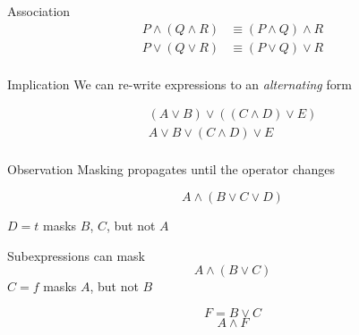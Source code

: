 \documentclass[xcolor = {dvipsnames, table}, aspectratio=169]{beamer}
\begin{document}
\begin{frame}
    \begin{block}{Association}
        \begin{align*}
            P \wedge (Q \wedge R) & \equiv (P \wedge Q) \wedge R \\
            P \vee (Q \vee R) & \equiv (P \vee Q) \vee R \\
        \end{align*}
    \end{block}

    \begin{block}{Implication}
        We can re-write expressions to an \emph{alternating} form

        \begin{align*}
            (A \vee B) \vee ((C \wedge D) \vee E) \\
            A \vee B \vee (C \wedge D) \vee E     \\
        \end{align*}
    \end{block}
\end{frame}

\begin{frame}
    \begin{block}{Observation}
        Masking propagates until the operator changes
    \end{block}

    \begin{block}{}
        \begin{equation*}
            A \wedge (B \vee C \vee D)
        \end{equation*}

        $D = t$ masks $B$, $C$, but not $A$
    \end{block}
\end{frame}

\begin{frame}
    \begin{block}{Subexpressions can mask}
        \begin{equation*}
            A \wedge (B \vee C)
        \end{equation*}
        $C = f$ masks $A$, but not $B$

        \begin{equation*}
            F = B \vee C
        \end{equation*}
        \begin{equation*}
            A \wedge F
        \end{equation*}
    \end{block}
\end{frame}
\end{document}
